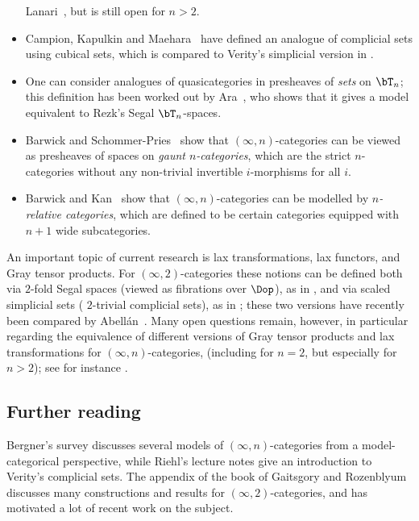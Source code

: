 \documentclass[a4paper,12pt]{article}
\begin{document}
\begin{remark}
\begin{itemize}
    Lanari~\cite{GHL}, but is still open for $n > 2$.
  \item Campion, Kapulkin and Maehara~\cite{CKMCube} have defined an
    analogue of complicial sets using cubical sets, which is compared to
    Verity's simplicial version in \cite{DKMCube}.
  \item One can consider analogues of quasicategories in presheaves of
    \emph{sets} on $\bT_{n}$; this definition has been worked out by
    Ara~\cite{AraTheta}, who shows that it gives a model equivalent to
    Rezk's Segal $\bT_{n}$-spaces.
  \item Barwick and Schommer-Pries~\cite{BSP} show that
    $(\infty,n)$-categories can be viewed as presheaves of spaces on
    \emph{gaunt $n$-categories}, which are the strict $n$-categories
    without any non-trivial invertible $i$-morphisms for all $i$.
  \item Barwick and Kan~\cite{BarwickKanN} show that
    $(\infty,n)$-categories can be modelled by \emph{$n$-relative
      categories}, which are defined to be certain categories equipped
    with $n+1$ wide subcategories.
  \end{itemize}
\end{remark}

\begin{remark}
  An important topic of current research is lax transformations, lax
  functors, and Gray tensor products. For $(\infty,2)$-categories
  these notions can be defined both via $2$-fold Segal spaces (viewed as
  fibrations over $\Dop$), as in \cite{GR}, and via scaled simplicial
  sets (\ie{} $2$-trivial complicial sets), as in \cite{GHLGray}; these
  two versions have recently been compared by
  Abell\'an~\cite{Abellan}. Many open questions remain, however, in
  particular regarding the equivalence of different versions of Gray
  tensor products and lax transformations for $(\infty,n)$-categories,
  (including for $n = 2$, but especially for $n > 2$); see for
  instance \cite{JFS,ORV,CampionGray}.
\end{remark}

\subsection{Further reading}
Bergner's survey \cite{BergnerSurvey} discusses several models of
$(\infty,n)$-categories from a
model-categorical perspective, while Riehl's lecture notes
\cite{RiehlCompl} give an introduction to Verity's complicial
sets. The appendix of the book of Gaitsgory and Rozenblyum \cite{GR}
discusses many constructions and results for $(\infty,2)$-categories,
and has motivated a lot of recent work on the subject.
\end{document}
